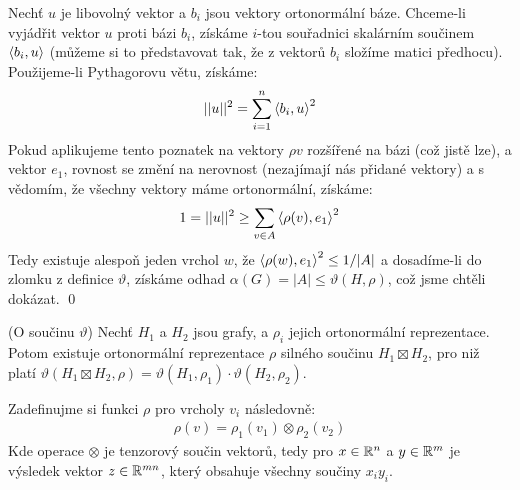 Nechť $u$ je libovolný vektor a $b_i$ jsou vektory ortonormální báze. Chceme-li vyjádřit vektor $u$ proti bázi $b_i$, získáme $i$-tou souřadnici skalárním součinem ${\langle b_i,u\rangle}$ (můžeme si to představovat tak, že z vektorů $b_i$ složíme matici předhocu). Použijeme-li Pythagorovu větu, získáme:
\begin{align}
	||u||^2 = \sum_{i=1}^n {\langle b_i,u\rangle}^2
\end{align}
Pokud aplikujeme tento poznatek na vektory $\rho{v}$ rozšířené na bázi (což jistě lze), a vektor $e_1$, rovnost se změní na nerovnost (nezajímají nás přidané vektory) a s vědomím, že všechny vektory máme ortonormální, získáme:
\begin{align}
	1=||u||^2 \geq \sum_{v\in A}{\langle \rho(v),e_1\rangle}^2
\end{align}
Tedy existuje alespoň jeden vrchol $w$, že ${\langle \rho(w),e_1\rangle}^2 \leq 1/|A|$ a dosadíme-li do zlomku z definice $\vartheta$, získáme odhad $ \alpha(G) = |A| \leq\vartheta(H,\rho)$, což jsme chtěli dokázat. \qed



\lm (O součinu $\vartheta$) Nechť $H_1$ a $H_2$ jsou grafy, a $\rho_i$ jejich 
ortonormální reprezentace. Potom existuje ortonormální reprezentace $\rho$ 
silného součinu $H_1 \boxtimes H_2$, pro niž platí $\vartheta(H_1 \boxtimes H_2, 
\rho) = \vartheta(H_1, \rho_1) \cdot \vartheta(H_2,\rho_2)$.

\dk Zadefinujme si funkci $\rho$ pro vrcholy $v_i$ následovně:
\begin{align}
	\rho(v) = \rho_1(v_1) \otimes \rho_2(v_2)
\end{align}
Kde operace $\otimes$ je tenzorový součin vektorů, tedy pro $x \in \mathbb{R}^n$ a $y 
\in \mathbb{R}^m$ je výsledek vektor $z \in \mathbb{R}^{mn}$, který obsahuje všechny součiny 
$x_iy_i$. 

